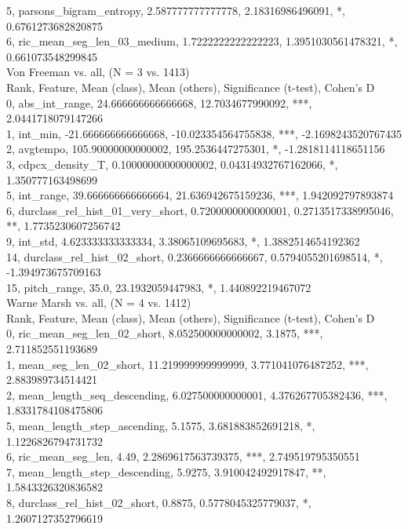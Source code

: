 5, parsons_bigram_entropy, 2.587777777777778, 2.18316986496091, *, 0.6761273682820875\\
6, ric_mean_seg_len_03_medium, 1.7222222222222223, 1.3951030561478321, *, 0.661073548299845\\
Von Freeman vs. all, (N = 3 vs. 1413)\\
Rank, Feature, Mean (class), Mean (others), Significance (t-test), Cohen's D\\
0, abs_int_range, 24.666666666666668, 12.7034677990092, ***, 2.0441718079147266\\
1, int_min, -21.666666666666668, -10.023354564755838, ***, -2.1698243520767435\\
2, avgtempo, 105.90000000000002, 195.2536447275301, *, -1.2818114118651156\\
3, cdpcx_density_T, 0.10000000000000002, 0.04314932767162066, *, 1.350777163498699\\
5, int_range, 39.666666666666664, 21.636942675159236, ***, 1.942092797893874\\
6, durclass_rel_hist_01_very_short, 0.7200000000000001, 0.2713517338995046, **, 1.7735230607256742\\
9, int_std, 4.623333333333334, 3.38065109695683, *, 1.3882514654192362\\
14, durclass_rel_hist_02_short, 0.2366666666666667, 0.5794055201698514, *, -1.394973675709163\\
15, pitch_range, 35.0, 23.1932059447983, *, 1.440892219467072\\
Warne Marsh vs. all, (N = 4 vs. 1412)\\
Rank, Feature, Mean (class), Mean (others), Significance (t-test), Cohen's D\\
0, ric_mean_seg_len_02_short, 8.052500000000002, 3.1875, ***, 2.711852551193689\\
1, mean_seg_len_02_short, 11.219999999999999, 3.771041076487252, ***, 2.883989734514421\\
2, mean_length_seq_descending, 6.027500000000001, 4.376267705382436, ***, 1.8331784108475806\\
5, mean_length_step_ascending, 5.1575, 3.681883852691218, *, 1.1226826794731732\\
6, ric_mean_seg_len, 4.49, 2.2869617563739375, ***, 2.749519795350551\\
7, mean_length_step_descending, 5.9275, 3.910042492917847, **, 1.5843326320836582\\
8, durclass_rel_hist_02_short, 0.8875, 0.5778045325779037, *, 1.2607127352796619\\
